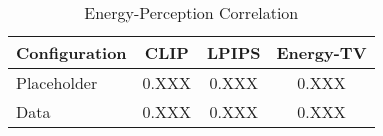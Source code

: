 
\begin{table}[H]
\centering
\caption{Energy-Perception Correlation}
\label{tab:table7_correlation}
\begin{tabular}{lccc}
\toprule
Configuration & CLIP & LPIPS & Energy-TV \\
\midrule
Placeholder & 0.XXX & 0.XXX & 0.XXX \\
Data & 0.XXX & 0.XXX & 0.XXX \\
\bottomrule
\end{tabular}
\end{table}
